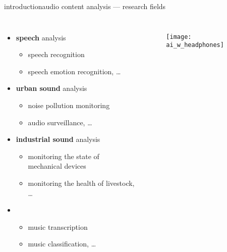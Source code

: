        \begin{frame}{introduction}{audio content analysis --- research fields}
            \vspace{-7mm}
            \begin{columns}
            \begin{itemize}
                \item   \textbf{speech} analysis
                    \begin{itemize}
                        \item   speech recognition
                        \item   speech emotion recognition, \ldots
                    \end{itemize}
                \smallskip
                \item<2->   \textbf{urban sound} analysis
                    \begin{itemize}
                        \item   noise pollution monitoring
                        \item   audio surveillance, \ldots
                    \end{itemize}
                \smallskip
                \item<3->   \textbf{industrial sound} analysis
                    \begin{itemize}
                        \item   monitoring the state of mechanical devices
                        \item   monitoring the health of livestock, \ldots
                    \end{itemize}
                \smallskip
                \item<4->   
                    \begin{itemize}
                        \item   music transcription
                        \item   music classification, \ldots
                    \end{itemize}
            \end{itemize}
                \begin{figure}%
                    \texttt{[image: ai\_w\_headphones]}%
                \end{figure}
            \end{columns}
        \end{frame}
        
